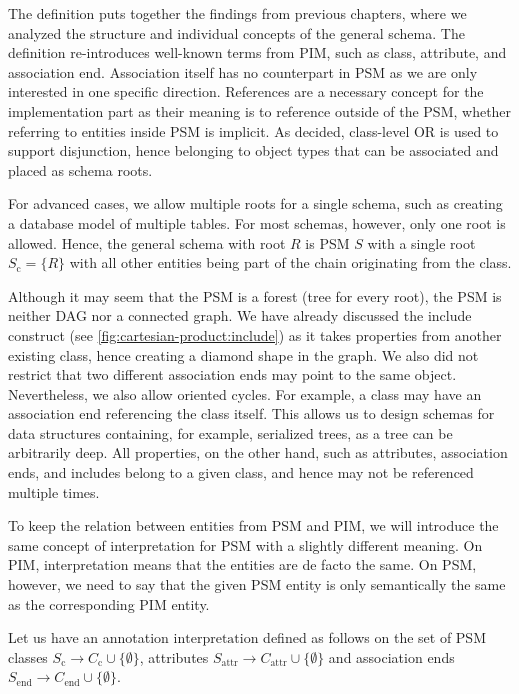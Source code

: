 
The definition puts together the findings from previous chapters, where we analyzed the structure and individual concepts of the general schema. The definition re-introduces well-known terms from PIM, such as class, attribute, and association end. Association itself has no counterpart in PSM as we are only interested in one specific direction. References are a necessary concept for the implementation part as their meaning is to reference outside of the PSM, whether referring to entities inside PSM is implicit. As decided, class-level OR is used to support disjunction, hence belonging to object types that can be associated and placed as schema roots.

For advanced cases, we allow multiple roots for a single schema, such as creating a database model of multiple tables. For most schemas, however, only one root is allowed. Hence, the general schema with root $R$ is PSM $S$ with a single root $S_{\textrm{c}} = \{R\}$ with all other entities being part of the chain originating from the class.

Although it may seem that the PSM is a forest (tree for every root), the PSM is neither DAG nor a connected graph. We have already discussed the include construct (see \autoref{fig:cartesian-product:include}) as it takes properties from another existing class, hence creating a diamond shape in the graph. We also did not restrict that two different association ends may point to the same object. Nevertheless, we also allow oriented cycles. For example, a class may have an association end referencing the class itself. This allows us to design schemas for data structures containing, for example, serialized trees, as a tree can be arbitrarily deep. All properties, on the other hand, such as attributes, association ends, and includes belong to a given class, and hence may not be referenced multiple times.

\medskip

To keep the relation between entities from PSM and PIM, we will introduce the same concept of interpretation for PSM with a slightly different meaning. On PIM, interpretation means that the entities are de facto the same. On PSM, however, we need to say that the given PSM entity is only semantically the same as the corresponding PIM entity. %

\begin{definition}
    Let us have an annotation $\textrm{interpretation}$ defined as follows on the set of PSM classes $S_{\textrm{c}}  \rightarrow C_{\textrm{c}} \cup \{\emptyset\}$, attributes $S_{\textrm{attr}}  \rightarrow C_{\textrm{attr}} \cup \{\emptyset\}$ and association ends $S_{\textrm{end}} \rightarrow C_{\textrm{end}} \cup \{\emptyset\}$.
\end{definition}


